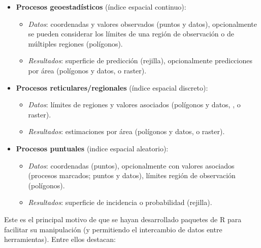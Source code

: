 \documentclass[
  spanish,
]{book}
\theoremstyle{break}
\begin{document}
\begin{itemize}
\item
  \textbf{Procesos geoestadísticos} (índice espacial continuo):

  \begin{itemize}
  \item
    \emph{Datos}: coordenadas y valores observados (puntos y datos), opcionalmente se pueden considerar los límites de una región de observación o de múltiples regiones (polígonos).
  \item
    \emph{Resultados}: superficie de predicción (rejilla),
    opcionalmente predicciones por área (polígonos y datos, o raster).
  \end{itemize}
\item
  \textbf{Procesos reticulares/regionales} (índice espacial discreto):

  \begin{itemize}
  \item
    \emph{Datos}: límites de regiones y valores asociados (polígonos y datos, , o raster).
  \item
    \emph{Resultados}: estimaciones por área (polígonos y datos, o raster).
  \end{itemize}
\item
  \textbf{Procesos puntuales} (indice espacial aleatorio):

  \begin{itemize}
  \item
    \emph{Datos}: coordenadas (puntos), opcionalmente con valores asociados (procesos marcados; puntos y datos),
    límites región de observación (polígonos).
  \item
    \emph{Resultados}: superficie de incidencia o probabilidad (rejilla).
  \end{itemize}
\end{itemize}

Este es el principal motivo de que se hayan desarrollado paquetes de R para facilitar su manipulación (y permitiendo el intercambio de datos entre herramientas).
Entre ellos destacan:
\end{document}
